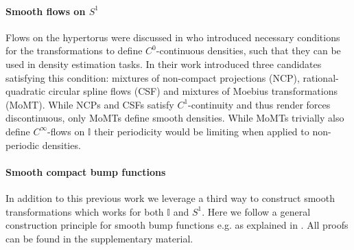 \documentclass{article}
\begin{document}
\paragraph{Smooth flows on $S^1$}
Flows on the hypertorus were discussed in \citet{rezende2020normalizing} who introduced necessary conditions for the transformations to define $C^{0}$-continuous densities, such that they can be used in density estimation tasks.
In their work \citet{rezende2020normalizing} introduced three candidates satisfying this condition: mixtures of non-compact projections (NCP), rational-quadratic circular spline flows (CSF) and mixtures of Moebius transformations (MoMT). While NCPs and CSFs satisfy $C^1$-continuity and thus render forces discontinuous, only MoMTs define smooth densities. While MoMTs trivially also define $C^{\infty}$-flows on $\mathbb{I}$ their periodicity would be limiting when applied to non-periodic densities.

\paragraph{Smooth compact bump functions}
In addition to this previous work we leverage a third way to construct smooth transformations which works for both $\mathbb{I}$ and $S^1$. Here we follow a general construction principle for smooth bump functions e.g. as explained in \citet{Tu2008}. All proofs can be found in the supplementary material.
\end{document}
